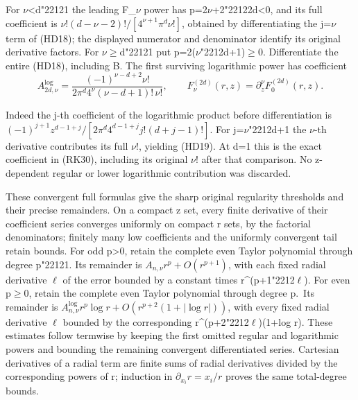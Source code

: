 \documentclass[
  11pt,
]{article}
\begin{document}
For \ensuremath{\nu}\textless d{\ReaderSymbols\char"2212}1 the leading F\_\ensuremath{\nu} power has p=2\ensuremath{\nu}+2{\ReaderSymbols\char"2212}2d\textless0, and
its full coefficient is \(\nu!(d-\nu-2)!/[4^{\nu+1}\pi^d\nu!]\),
obtained by differentiating the j=\ensuremath{\nu} term of (HD18); the displayed
numerator and denominator identify its original derivative factors. For
\ensuremath{\nu}\ensuremath{\geq}d{\ReaderSymbols\char"2212}1 put p=2(\ensuremath{\nu}{\ReaderSymbols\char"2212}d+1)\ensuremath{\geq}0. Differentiate the entire (HD18), including B.
The first surviving logarithmic power has coefficient \[
A^{\log}_{2d,\nu}
 =\frac{(-1)^{\nu-d+2}\nu!}
           {2\pi^d4^\nu(\nu-d+1)!\,\nu!},
\qquad
F_\nu^{(2d)}(r,z)=\partial_z^\nu F_0^{(2d)}(r,z).
\tag{HD19}
\] {\small\sloppy
Indeed the j-th coefficient of the logarithmic product before
differentiation is \((-1)^{j+1}z^{d-1+j}/[2\pi^d4^{d-1+j}j!(d+j-1)!]\).
For j=\ensuremath{\nu}{\ReaderSymbols\char"2212}d+1 the \ensuremath{\nu}-th derivative contributes its full \ensuremath{\nu}!, yielding
(HD19). At d=1 this is the exact coefficient in (RK30), including its
original \ensuremath{\nu}! after that comparison. No z-dependent regular or lower
logarithmic contribution was discarded.
\par}

These convergent full formulas give the sharp original regularity
thresholds and their precise remainders. On a compact z set, every
finite derivative of their coefficient series converges uniformly on
compact r sets, by the factorial denominators; finitely many low
coefficients and the uniformly convergent tail retain bounds. For odd
p\textgreater0, retain the complete even Taylor polynomial through
degree p{\ReaderSymbols\char"2212}1. Its remainder is \(A_{n,\nu}r^p+O(r^{p+1})\), with each
fixed radial derivative \ensuremath{\ell} of the error bounded by a constant times
r\^{}(p+1{\ReaderSymbols\char"2212}\ensuremath{\ell}). For even p\ensuremath{\geq}0, retain the complete even Taylor polynomial
through degree p.~Its remainder is
\(A^{\log}_{n,\nu}r^p\log r+O(r^{p+2}(1+|\log r|))\), with every fixed
radial derivative \ensuremath{\ell} bounded by the corresponding
r\^{}(p+2{\ReaderSymbols\char"2212}\ensuremath{\ell})(1+\textbar log r\textbar). These estimates follow termwise
by keeping the first omitted regular and logarithmic powers and bounding
the remaining convergent differentiated series. Cartesian derivatives of
a radial term are finite sums of radial derivatives divided by the
corresponding powers of r; induction in \(\partial_{x_i}r=x_i/r\) proves
the same total-degree bounds.
\end{document}
